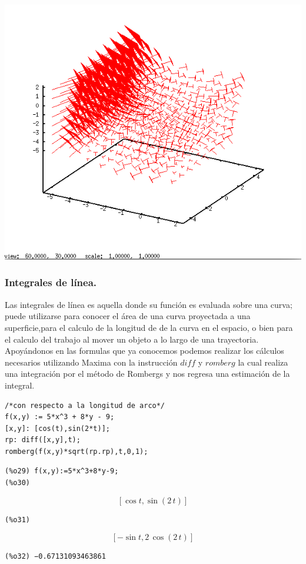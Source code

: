 \documentclass[12pt]{article}
\begin{document}
  \includegraphics[scale=0.5]{actividad85.png}
\pagebreak

\subsubsection*{Integrales de línea.}

Las integrales de línea es aquella donde su función es evaluada sobre una curva; puede utilizarse para conocer el área de una curva proyectada a una superficie,para el calculo de la longitud de de la curva en el espacio, o bien para el calculo del trabajo al mover un objeto a lo largo de una trayectoria.\\

Apoyándonos en las formulas que ya conocemos podemos realizar los cálculos necesarios utilizando Maxima con la instrucción $diff$ y $romberg$ la cual realiza una integración por el método de Rombergs y nos regresa una estimación de la integral.

\begin{verbatim}
/*con respecto a la longitud de arco*/
f(x,y) := 5*x^3 + 8*y - 9;
[x,y]: [cos(t),sin(2*t)];
rp: diff([x,y],t);
romberg(f(x,y)*sqrt(rp.rp),t,0,1);
\end{verbatim}

\begin{verbatim}
(%o29) f(x,y):=5*x^3+8*y-9;
(%o30)
\end{verbatim}
$$\left[ \cos t , \sin \left(2\,t\right) \right] $$
\begin{verbatim}
(%o31)
\end{verbatim}
$$\left[ -\sin t , 2\,\cos \left(2\,t\right) \right] $$
\begin{verbatim}
(%o32) −0.67131093463861
\end{verbatim}
\end{document}
